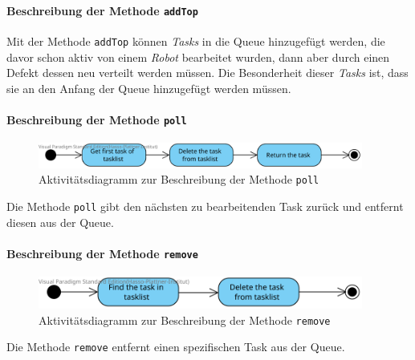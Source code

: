 			\paragraph{Beschreibung der Methode \texttt{addTop}}		
			
			Mit der Methode \texttt{addTop} können \textit{Tasks} in die Queue hinzugefügt werden, die davor schon aktiv von einem \textit{Robot} bearbeitet wurden, dann aber durch einen Defekt dessen neu verteilt werden müssen. 
			Die Besonderheit dieser \textit{Tasks} ist, dass sie an den Anfang der Queue hinzugefügt werden müssen.
				
			\paragraph{Beschreibung der Methode \texttt{poll}}		
			\begin{figure}[H]
			\centering
			\includegraphics[width=0.95\textwidth]{img/2-Entwurf-poll}
			\caption{Aktivitätsdiagramm zur Beschreibung der Methode \texttt{poll}}
			\label{SequenzQueuePoll}
			\end{figure}			
			
			Die Methode \texttt{poll} gibt den nächsten zu bearbeitenden Task zurück und entfernt diesen aus der Queue.
				
			\paragraph{Beschreibung der Methode \texttt{remove}}		
			\begin{figure}[H]
			\centering
			\includegraphics[width=0.95\textwidth]{img/2-Entwurf-remove}
			\caption{Aktivitätsdiagramm zur Beschreibung der Methode \texttt{remove}}
			\label{SequenzQueueRemove}
			\end{figure}			
			
			Die Methode \texttt{remove} entfernt einen spezifischen Task aus der Queue.
			

